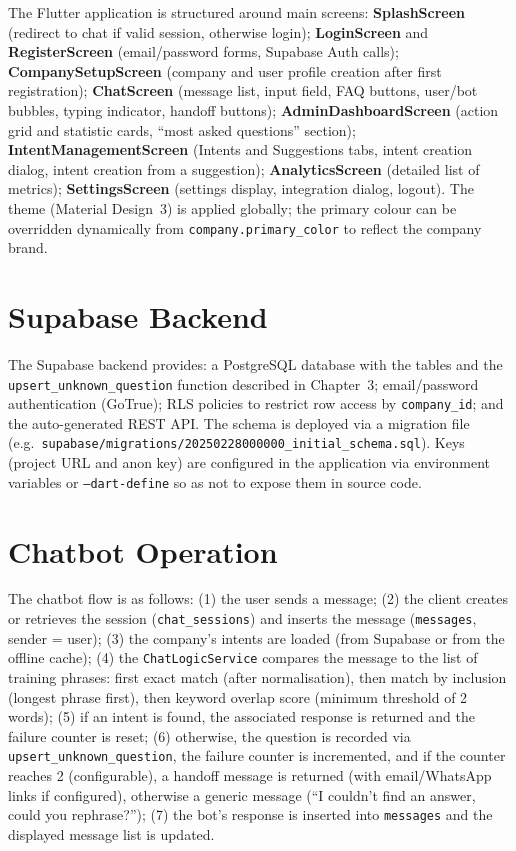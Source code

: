 \documentclass[12pt,a4paper]{report}
\begin{document}
The Flutter application is structured around main screens: \textbf{SplashScreen} (redirect to chat if valid session, otherwise login); \textbf{LoginScreen} and \textbf{RegisterScreen} (email/password forms, Supabase Auth calls); \textbf{CompanySetupScreen} (company and user profile creation after first registration); \textbf{ChatScreen} (message list, input field, FAQ buttons, user/bot bubbles, typing indicator, handoff buttons); \textbf{AdminDashboardScreen} (action grid and statistic cards, ``most asked questions'' section); \textbf{IntentManagementScreen} (Intents and Suggestions tabs, intent creation dialog, intent creation from a suggestion); \textbf{AnalyticsScreen} (detailed list of metrics); \textbf{SettingsScreen} (settings display, integration dialog, logout). The theme (Material Design~3) is applied globally; the primary colour can be overridden dynamically from \texttt{company.primary\_color} to reflect the company brand.

\section{Supabase Backend}

The Supabase backend provides: a PostgreSQL database with the tables and the \texttt{upsert\_unknown\_question} function described in Chapter~3; email/password authentication (GoTrue); RLS policies to restrict row access by \texttt{company\_id}; and the auto-generated REST API. The schema is deployed via a migration file (e.g.\ \texttt{supabase/migrations/20250228000000\_initial\_schema.sql}). Keys (project URL and anon key) are configured in the application via environment variables or \texttt{--dart-define} so as not to expose them in source code.

\section{Chatbot Operation}

The chatbot flow is as follows: (1) the user sends a message; (2) the client creates or retrieves the session (\texttt{chat\_sessions}) and inserts the message (\texttt{messages}, sender = user); (3) the company's intents are loaded (from Supabase or from the offline cache); (4) the \texttt{ChatLogicService} compares the message to the list of training phrases: first exact match (after normalisation), then match by inclusion (longest phrase first), then keyword overlap score (minimum threshold of 2 words); (5) if an intent is found, the associated response is returned and the failure counter is reset; (6) otherwise, the question is recorded via \texttt{upsert\_unknown\_question}, the failure counter is incremented, and if the counter reaches 2 (configurable), a handoff message is returned (with email/WhatsApp links if configured), otherwise a generic message (``I couldn't find an answer, could you rephrase?''); (7) the bot's response is inserted into \texttt{messages} and the displayed message list is updated.
\end{document}
